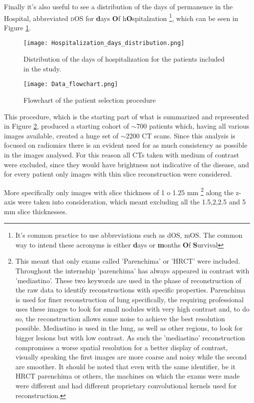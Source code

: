 Finally it's also useful to see a distribution of the days of permanence in the Hospital, abbreviated {\scshape dOS} for \textbf{d}ays \textbf{O}f h\textbf{O}spitalzation
\footnote{It's common practice to use abbreviations such as dOS, mOS. The common way to intend these acronyms is either \textbf{d}ays or \textbf{m}onths \textbf{O}f \textbf{S}urvival},
 which can be seen in Figure \ref{fig:dOSDistr}.

\begin{figure}[htbp]
\texttt{[image: Hospitalization\_days\_distribution.png]}
\caption{Distribution of the days of hospitalization for the patients included in the study.\label{fig:dOSDistr}}
\end{figure}

\begin{figure}[htbp]
\texttt{[image: Data\_flowchart.png]}
\caption{Flowchart of the patient selection procedure \label{fig:dataSelFlowchart}}
\end{figure}

This procedure, which is the starting part of what is summarized and represented in Figure \ref{fig:dataSelFlowchart}, produced a starting cohort of $\sim$700 patients which, having all various images available, created a huge set of $\sim$2200 CT scans. Since this analysis is focused on radiomics there is an evident need for as much consistency as possible in the images analysed. For this reason all CTs taken with medium of contrast were excluded, since they would have brightness not indicative of the disease, and for every patient only images with thin slice reconstruction were considered. 

More specifically only images with slice thickness of 1 o 1.25 mm
\footnote{This meant that only exams called 'Parenchima' or  'HRCT' were included. Throughout the internship 'parenchima' has always appeared in contrast with 'mediastino'. These two keywords are used in the phase of reconstruction of the raw data to identify reconstructions with specific properties. Parenchima is used for finer reconstruction of lung specifically, the requiring professional uses these images to look for small nodules with very high contrast and, to do so, the reconstruction allows some noise to achieve the best resolution possible. Mediastino is used in the lung, as well as other regions, to look for bigger lesions but with low contrast. As such the 'mediastino' reconstruction compromises a worse spatial resolution for a better display of contrast, visually speaking the first images are more coarse and noisy while the second are smoother. It should be noted that even with the same identifier, be it HRCT parenchima or others, the machines on which the exams were made were different and had different proprietary convolutional kernels used for reconstruction.} 
along the z-axis were taken into consideration, which meant excluding all the 1.5,2,2.5 and 5 mm slice thicknesses.

